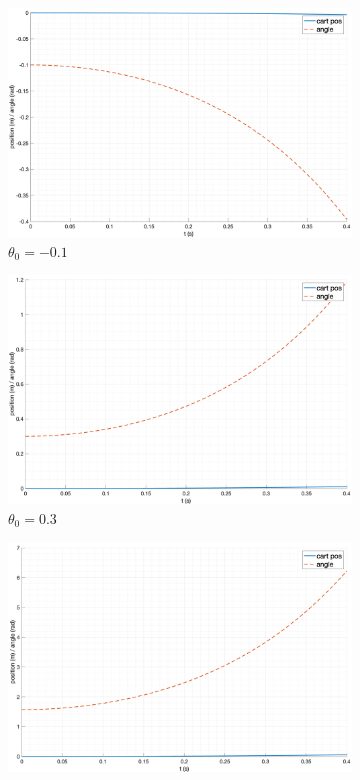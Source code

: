 \begin{figure}[ht!]
\begin{subfigure}[b]{0.45\textwidth}
        \includegraphics[width=\textwidth]{media/plots/free_motion/lin_3.png}
        \caption{$\theta_0 = -0.1$}
    \end{subfigure}
    \begin{subfigure}[b]{0.45\textwidth}
        \includegraphics[width=\textwidth]{media/plots/free_motion/lin_4.png}
        \caption{$\theta_0 = 0.3$}
    \end{subfigure}
    \begin{subfigure}[b]{0.45\textwidth}
        \includegraphics[width=\textwidth]{media/plots/free_motion/lin_5.png}

\end{subfigure}
\end{figure}
